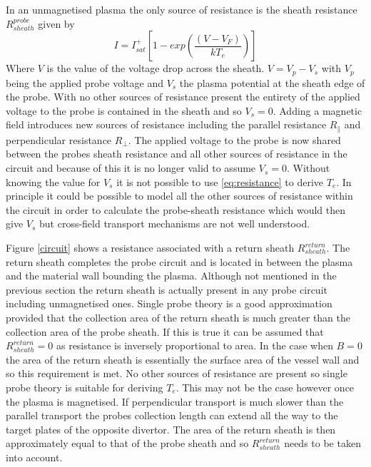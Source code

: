 \documentclass[12pt]{article}
\def\be{\begin{equation}}
\def\ee{\end{equation}}
\begin{document}
In an unmagnetised plasma the only source of resistance is the sheath resistance $R^{probe}_{sheath}$ given by
\be 
I = I_{sat}^{+}  \left[1-exp ( \frac{(V-V_F)}{k T_e} ) \right]
\label{eq:resistance}
\ee 
Where $V$ is the value of the voltage drop across the sheath. $V = V_p - V_s$ with $V_p$ being the applied probe voltage and $V_s$ the plasma potential at the sheath edge of the probe. With no other sources of resistance present the entirety of the applied voltage to the probe is contained in the sheath and so $V_s = 0$. Adding a magnetic field introduces new sources of resistance including the parallel resistance $R_\parallel$ and perpendicular resistance $R_\perp$. The applied voltage to the probe is now shared between the probes sheath resistance and all other sources of resistance in the circuit and because of this it is no longer valid to assume $V_s = 0$. Without knowing the value for $V_s$ it is not possible to use \eqref{eq:resistance} to derive $T_e$. In principle it could be possible to model all the other sources of resistance within the circuit in order to calculate the probe-sheath resistance which would then give $V_s$ but cross-field transport mechanisms are not well understood.


Figure \ref{circuit} shows a resistance associated with a return sheath $R^{return}_{sheath}$. The return sheath completes the probe circuit and is located in between the plasma and the material wall bounding the plasma. Although not mentioned in the previous section the return sheath is actually present in any probe circuit including unmagnetised ones. Single probe theory is a good approximation provided that the collection area of the return sheath is much greater than the collection area of the probe sheath. If this is true it can be assumed that $R^{return}_{sheath} =0$ as resistance is inversely proportional to area. In the case when $B=0$ the area of the return sheath is essentially the surface area of the vessel wall and so this requirement is met. No other sources of resistance are present so single probe theory is suitable for deriving $T_e$. This may not be the case however once the plasma is magnetised. If perpendicular transport is much slower than the parallel transport the probes collection length can extend all the way to the target plates of the opposite divertor. The area of the return sheath is then approximately equal to that of the probe sheath and so $R^{return}_{sheath}$ needs to be taken into account.
\end{document}
